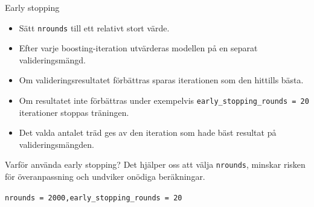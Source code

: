 \documentclass[10pt,english]{beamer}
\begin{document}
\begin{frame}{Early stopping}

  \begin{itemize}

    \item Sätt \texttt{nrounds} till ett relativt stort värde.

    \item Efter varje boosting-iteration utvärderas modellen
          på en separat valideringsmängd.

    \item Om valideringsresultatet förbättras sparas iterationen
          som den hittills bästa.

    \item Om resultatet inte förbättras under exempelvis
          \texttt{early\_stopping\_rounds = 20} iterationer
          stoppas träningen.

    \item Det valda antalet träd ges av den iteration som hade
          bäst resultat på valideringsmängden.

  \end{itemize}

  \vspace{0.2cm}

  \begin{block}{Varför använda early stopping?}
    Det hjälper oss att välja \texttt{nrounds}, minskar risken för
    överanpassning och undviker onödiga beräkningar.
  \end{block}

  \vspace{0.2cm}

  \centering
  \texttt{nrounds = 2000,\quad early\_stopping\_rounds = 20}

\end{frame}
\end{document}
